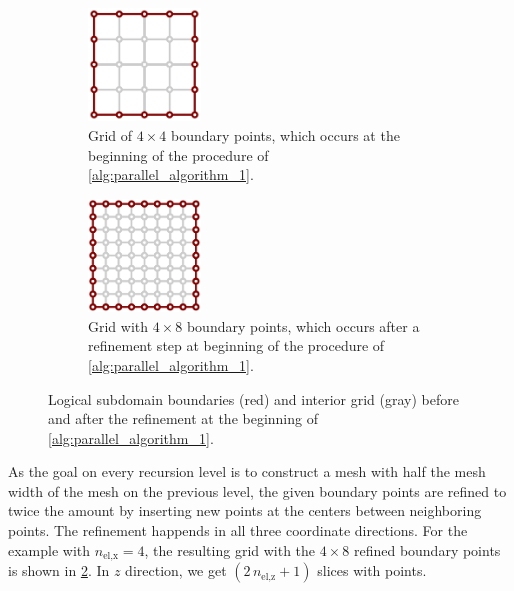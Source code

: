 \begin{figure}%
  \centering%
  \begin{subfigure}[t]{0.48\textwidth}%
    \centering%
    \includegraphics[width=3cm]{images/parallel_fiber_estimation/boundary_grid.pdf}%
   \caption{Grid of $4 \times 4$ boundary points, which occurs at the beginning of the procedure of \cref{alg:parallel_algorithm_1}.}%
    \label{fig:boundary_grid_1}%
  \end{subfigure}
  \quad
  \begin{subfigure}[t]{0.48\textwidth}%
    \centering%
    \includegraphics[width=3cm]{images/parallel_fiber_estimation/boundary_grid_2.pdf}%
    \caption{Grid with $4 \times 8$ boundary points, which occurs after a refinement step at beginning of the procedure of \cref{alg:parallel_algorithm_1}.}%
    \label{fig:boundary_grid_2}%
  \end{subfigure}   
  \caption{Logical subdomain boundaries (red) and interior grid (gray) before and after the refinement at the beginning of \cref{alg:parallel_algorithm_1}.}%
  \label{fig:boundary_grid}%
\end{figure}%

As the goal on every recursion level is to construct a mesh with half the mesh width of the mesh on the previous level, the given boundary points are refined to twice the amount by inserting new points at the centers between neighboring points. The refinement happends in all three coordinate directions. For the example with $n_\text{el,x}=4$, the resulting grid with the $4\times 8$ refined boundary points is shown in \cref{fig:boundary_grid_2}. In $z$ direction, we get $(2\,n_\text{el,z}+1)$ slices with points.

